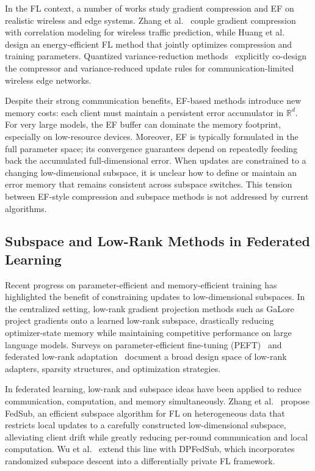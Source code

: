 In the FL context, a number of works study gradient compression and EF on realistic wireless and edge systems. Zhang et al.~\cite{zhang2025gradient} couple gradient compression with correlation modeling for wireless traffic prediction, while Huang et al.~\cite{huang2025energy} design an energy-efficient FL method that jointly optimizes compression and training parameters. Quantized variance-reduction methods~\cite{wang2025quantizedvr} explicitly co-design the compressor and variance-reduced update rules for communication-limited wireless edge networks.

Despite their strong communication benefits, EF-based methods introduce new memory costs: each client must maintain a persistent error accumulator in $\mathbb{R}^d$. For very large models, the EF buffer can dominate the memory footprint, especially on low-resource devices. Moreover, EF is typically formulated in the full parameter space; its convergence guarantees depend on repeatedly feeding back the accumulated full-dimensional error. When updates are constrained to a changing low-dimensional subspace, it is unclear how to define or maintain an error memory that remains consistent across subspace switches. This tension between EF-style compression and subspace methods is not addressed by current algorithms.

\subsection{Subspace and Low-Rank Methods in Federated Learning}

Recent progress on parameter-efficient and memory-efficient training has highlighted the benefit of constraining updates to low-dimensional subspaces. In the centralized setting, low-rank gradient projection methods such as GaLore~\cite{zhao2024galore} project gradients onto a learned low-rank subspace, drastically reducing optimizer-state memory while maintaining competitive performance on large language models. Surveys on parameter-efficient fine-tuning (PEFT)~\cite{han2024peftsurvey} and federated low-rank adaptation~\cite{yang2025fedlora_survey} document a broad design space of low-rank adapters, sparsity structures, and optimization strategies.

In federated learning, low-rank and subspace ideas have been applied to reduce communication, computation, and memory simultaneously. Zhang et al.~\cite{zhang2025fedsub} propose FedSub, an efficient subspace algorithm for FL on heterogeneous data that restricts local updates to a carefully constructed low-dimensional subspace, alleviating client drift while greatly reducing per-round communication and local computation. Wu et al.~\cite{wu2025dpfedsub} extend this line with DPFedSub, which incorporates randomized subspace descent into a differentially private FL framework.

